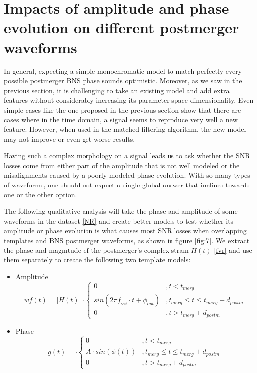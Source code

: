 \FloatBarrier





\section{Impacts of amplitude and phase evolution on different postmerger  waveforms}

In general, expecting a simple monochromatic model to match perfectly every possible postmerger BNS phase sounds optimistic. Moreover, as we saw in the previous section, it is challenging to take an existing model and add extra features without considerably increasing its parameter space dimensionality. Even simple cases like the one proposed in the previous section show that there are cases where in the time domain, a signal seems to reproduce very well a new feature. However, when used in the matched filtering algorithm, the new model may not improve or even get worse results. 

Having such a complex morphology on a signal leads us to ask whether the SNR losses come from either part of the amplitude that is not well modeled or the misalignments caused by a poorly modeled phase evolution. With so many types of waveforms, one should not expect a single global answer that inclines towards one or the other option.

The following qualitative analysis will take the phase and amplitude of some waveforms in the dataset \ref{NR} and create better models to test whether its amplitude or phase evolution is what causes most SNR losses when overlapping templates and BNS postmerger waveforms, as shown in figure \ref{fig:7}. We extract the phase and magnitude of the postmerger's complex strain $H(t)$ \ref{fvr} and use them separately to create the following two template models:

\begin{itemize}
\item Amplitude
\begin{equation}\label{a-evol}w
f(t) = |H(t)| \cdot \begin{cases} 
      0 &, t< t_{merg} \\
      sin(2\pi f_{_{best}}\cdot t + \phi_{opt}) &, t_{merg} \leq t \leq t_{merg} + d_{postm} \\
      0 &, t> t_{merg} + d_{postm}
   \end{cases}
\end{equation}

\item Phase
\begin{equation}\label{pha-evol}
g(t) = \cdot \begin{cases} 
      0 &, t< t_{merg} \\
      A \cdot sin(\phi(t)) &, t_{merg} \leq t \leq t_{merg} + d_{postm} \\
      0 &, t> t_{merg} + d_{postm}
   \end{cases}
\end{equation}

\end{itemize}


